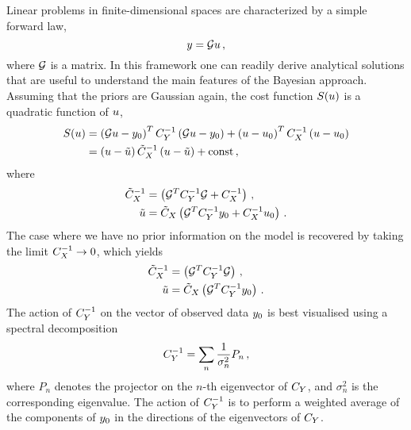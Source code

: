 Linear problems in finite-dimensional spaces are characterized by a simple forward law, 
\begin{equation}
  \label{eq:MatrixG}
  y = \mathcal{G} u\, ,
\end{equation}
where $\mathcal{G}$ is a matrix. In this framework one can readily  derive
analytical solutions that are useful to understand the main features of the
Bayesian approach. Assuming that the priors are Gaussian again, the cost
function $S(u)$ is a quadratic function of $u$,
\begin{align}
  \label{eq:CostLinGauss}
  S(u) &= 
  \left(\mathcal{G} u - y_0 \right)^T C_{Y}^{-1} 
  \left(\mathcal{G} u - y_0 \right) + 
  \left( u - u_0 \right)^T C_X^{-1} \left(u - u_0 \right) \\
  &= 
  \left(u - \tilde{u}\right) \tilde{C}_X^{-1}
  \left(u - \tilde{u}\right) + \mathrm{const}\, ,
\end{align} 
where
\begin{align}
  \label{eq:PostParamsCov}
  \tilde{C}_X^{-1} &= 
  \left(
    \mathcal{G}^T C_{Y}^{-1} \mathcal{G} + C_X^{-1}
  \right)\, , \\
  \label{eq:PostParamsMean}
  \tilde{u} &=
  \tilde{C}_X  \left(
    \mathcal{G}^T C_{Y}^{-1} y_0 + C_X^{-1} u_0
  \right)\, .
\end{align}
The case where we have no prior information on the model is recovered by taking
the limit $C_X^{-1} \to 0$, which yields
\begin{align}
  \label{eq:NoPriorLinModel}
  \tilde{C}_X^{-1} &= 
  \left(
    \mathcal{G}^T C_{Y}^{-1} \mathcal{G}
  \right)\, , \\
  \tilde{u} &=
  \tilde{C}_X  \left(
    \mathcal{G}^T C_{Y}^{-1} y_0 
  \right)\, . \label{eq:NoPriorLinModelCov}
\end{align}
The action of $C_{Y}^{-1}$ on the vector of observed data $y_0$
is best visualised using a spectral decomposition
\begin{equation}
  \label{eq:CDSpecDec}
  C_{Y}^{-1} = \sum_n \frac{1}{\sigma_n^2} P_n\, ,
\end{equation}
where $P_n$ denotes the projector on the $n$-th eigenvector of $C_{Y}$, and
$\sigma_n^2$ is the corresponding eigenvalue. The action of $C_{Y}^{-1}$ is to
perform a weighted average of the components of $y_0$ in the directions of the
eigenvectors of $C_{Y}$.

